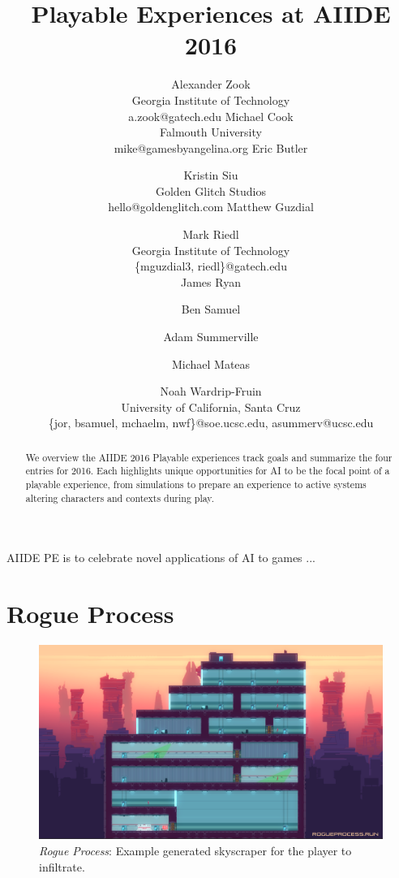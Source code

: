 \documentclass[letterpaper]{article}
\begin{document}
\title{Playable Experiences at AIIDE 2016}
\author{
Alexander Zook \\ Georgia Institute of Technology \\ a.zook@gatech.edu
\And Michael Cook \\ Falmouth University \\ mike@gamesbyangelina.org
\AND Eric Butler \and Kristin Siu \\ Golden Glitch Studios \\ hello@goldenglitch.com
\And Matthew Guzdial \and Mark Riedl \\ Georgia Institute of Technology \\ \{mguzdial3, riedl\}@gatech.edu \\
\AND James Ryan \and Ben Samuel \and Adam Summerville \and Michael Mateas \and Noah Wardrip-Fruin \\ University of California, Santa Cruz \\ \{jor, bsamuel, mchaelm, nwf\}@soe.ucsc.edu, asummerv@ucsc.edu \\
}


\maketitle
\begin{abstract}
We overview the AIIDE 2016 Playable experiences track goals and summarize the four entries for 2016.
Each highlights unique opportunities for AI to be the focal point of a playable experience, from simulations to prepare an experience to active systems altering characters and contexts during play.
\end{abstract}

\noindent AIIDE PE is to celebrate novel applications of AI to games
...

\section{Rogue Process}

\begin{figure}[tbh]
  \centering
  \includegraphics[width=\columnwidth]{images/rogue_process-screen}
  \caption{\textit{Rogue Process}: Example generated skyscraper for the player to infiltrate.}
  \label{fig:rp-setting}
\end{figure}
\end{document}
